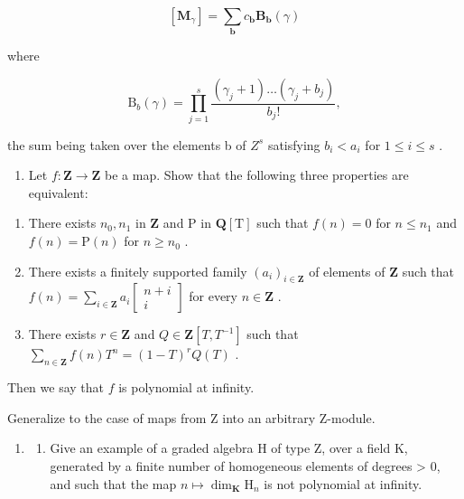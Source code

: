 \[
[ \mathbf {M} _ {\gamma} ] = \sum_ {\boldsymbol {b}} c _ {\boldsymbol {b}} \mathbf {B} _ {\boldsymbol {b}} (\gamma)
\]

where

\[
\mathrm{B} _ {b} (\gamma) = \prod_ {j = 1} ^ {s} \frac {(\gamma_ {j} + 1) \dots (\gamma_ {j} + b _ {j})}{b _ {j} !},
\]

the sum being taken over the elements b of \(Z^{s}\) satisfying \(b_{i} < a_{i}\) for \(1 \leqslant i \leqslant s\) .

\begin{enumerate}
\def\labelenumi{\arabic{enumi})}
\setcounter{enumi}{1}
\tightlist
\item
  Let \(f: \mathbf{Z} \to \mathbf{Z}\) be a map. Show that the following three properties are equivalent:
\end{enumerate}

\begin{enumerate}
\def\labelenumi{\alph{enumi})}
\item
  There exists \(n_0, n_1\) in \(\mathbf{Z}\) and \(\mathrm{P}\) in \(\mathbf{Q}[\mathrm{T}]\) such that \(f(n) = 0\) for \(n \leqslant n_1\) and \(f(n) = \mathrm{P}(n)\) for \(n \geqslant n_0\) .
\item
  There exists a finitely supported family \((a_i)_{i\in \mathbf{Z}}\) of elements of \(\mathbf{Z}\) such that \(f(n) = \sum_{i\in \mathbf{Z}}a_i\left[ \begin{array}{cc}n + i\\ i \end{array} \right]\) for every \(n\in \mathbf{Z}\) .
\item
  There exists \(r \in \mathbf{Z}\) and \(Q \in \mathbf{Z}[T, T^{-1}]\) such that \(\sum_{n \in \mathbf{Z}} f(n) T^n = (1 - T)^r Q(T)\) .
\end{enumerate}

Then we say that \(f\) is polynomial at infinity.

Generalize to the case of maps from Z into an arbitrary Z-module.

\begin{enumerate}
\def\labelenumi{\arabic{enumi})}
\setcounter{enumi}{2}
\tightlist
\item
  \begin{enumerate}
  \def\labelenumii{\alph{enumii})}
  \tightlist
  \item
    Give an example of a graded algebra H of type Z, over a field K, generated by a finite number of homogeneous elements of degrees \textgreater{} 0, and such that the map \(n \mapsto \dim_{\mathbf{K}} \mathrm{H}_{n}\) is not polynomial at infinity.
  \end{enumerate}
\end{enumerate}

